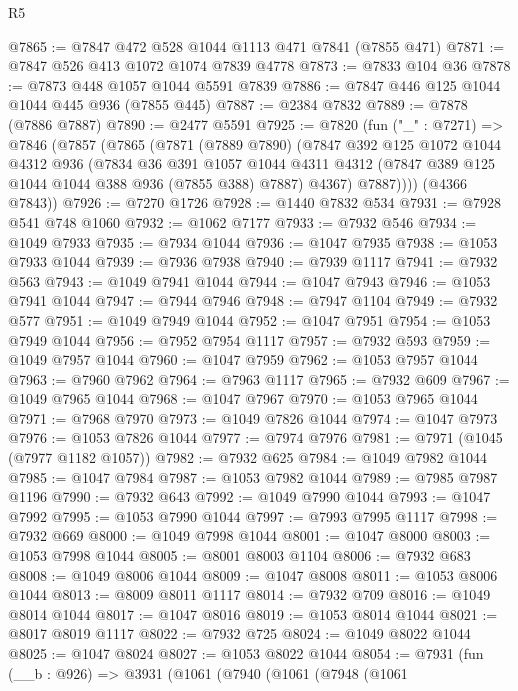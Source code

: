 \begin{lexlean}{R5}
\begin{coremodule}
@7865 := @7847 @472 @528 @1044 @1113 @471 @7841 (@7855 @471)
@7871 := @7847 @526 @413 @1072 @1074 @7839 @4778
@7873 := @7833 @104 @36
@7878 := @7873 @448 @1057 @1044 @5591 @7839
@7886 := @7847 @446 @125 @1044 @1044 @445 @936 (@7855 @445)
@7887 := @2384 @7832
@7889 := @7878 (@7886 @7887)
@7890 := @2477 @5591
@7925 := @7820
    (fun ("_" : @7271) =>
    @7846
      (@7857
        (@7865
          (@7871
            (@7889 @7890)
            (@7847
              @392
              @125
              @1072
              @1044
              @4312
              @936
              (@7834
                @36
                @391
                @1057
                @1044
                @4311
                @4312
                (@7847 @389 @125 @1044 @1044 @388 @936 (@7855 @388) @7887)
                @4367)
              @7887))))
      (@4366 @7843))
@7926 := @7270 @1726
@7928 := @1440 @7832 @534
@7931 := @7928 @541 @748 @1060
@7932 := @1062 @7177
@7933 := @7932 @546
@7934 := @1049 @7933
@7935 := @7934 @1044
@7936 := @1047 @7935
@7938 := @1053 @7933 @1044
@7939 := @7936 @7938
@7940 := @7939 @1117
@7941 := @7932 @563
@7943 := @1049 @7941 @1044
@7944 := @1047 @7943
@7946 := @1053 @7941 @1044
@7947 := @7944 @7946
@7948 := @7947 @1104
@7949 := @7932 @577
@7951 := @1049 @7949 @1044
@7952 := @1047 @7951
@7954 := @1053 @7949 @1044
@7956 := @7952 @7954 @1117
@7957 := @7932 @593
@7959 := @1049 @7957 @1044
@7960 := @1047 @7959
@7962 := @1053 @7957 @1044
@7963 := @7960 @7962
@7964 := @7963 @1117
@7965 := @7932 @609
@7967 := @1049 @7965 @1044
@7968 := @1047 @7967
@7970 := @1053 @7965 @1044
@7971 := @7968 @7970
@7973 := @1049 @7826 @1044
@7974 := @1047 @7973
@7976 := @1053 @7826 @1044
@7977 := @7974 @7976
@7981 := @7971 (@1045 (@7977 @1182 @1057))
@7982 := @7932 @625
@7984 := @1049 @7982 @1044
@7985 := @1047 @7984
@7987 := @1053 @7982 @1044
@7989 := @7985 @7987 @1196
@7990 := @7932 @643
@7992 := @1049 @7990 @1044
@7993 := @1047 @7992
@7995 := @1053 @7990 @1044
@7997 := @7993 @7995 @1117
@7998 := @7932 @669
@8000 := @1049 @7998 @1044
@8001 := @1047 @8000
@8003 := @1053 @7998 @1044
@8005 := @8001 @8003 @1104
@8006 := @7932 @683
@8008 := @1049 @8006 @1044
@8009 := @1047 @8008
@8011 := @1053 @8006 @1044
@8013 := @8009 @8011 @1117
@8014 := @7932 @709
@8016 := @1049 @8014 @1044
@8017 := @1047 @8016
@8019 := @1053 @8014 @1044
@8021 := @8017 @8019 @1117
@8022 := @7932 @725
@8024 := @1049 @8022 @1044
@8025 := @1047 @8024
@8027 := @1053 @8022 @1044
@8054 := @7931
    (fun (__b : @926) =>
    @3931
      (@1061
        (@7940
          (@1061
            (@7948
              (@1061

\end{coremodule}
\end{lexlean}

